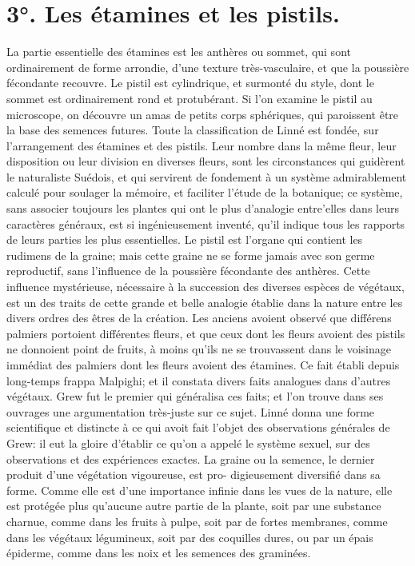 \section{3°. Les étamines et les pistils.}
La partie essentielle des étamines est les anthères ou sommet, qui sont ordinairement de forme arrondie, d'une texture très-vasculaire, et que la poussière fécondante recouvre.
Le pistil est cylindrique, et surmonté du style, dont le sommet est ordinairement rond et protubérant.
Si l'on examine le pistil au microscope, on découvre un amas de petits corps sphériques, qui paroissent être la base des semences futures.
Toute la classification de Linné est fondée, sur l'arrangement des étamines et des pistils. Leur nombre dans la même fleur, leur disposition ou leur division en diverses fleurs, sont les circonstances qui guidèrent le naturaliste Suédois, et qui servirent de fondement à un système admirablement calculé pour soulager la mémoire, et faciliter l'étude de la botanique; ce système, sans associer toujours les plantes qui ont le plus d'analogie entre'elles dans leurs caractères généraux, est si ingénieusement inventé, qu'il indique tous les rapports de leurs parties les plus essentielles.\setcounter{page}{389} Le pistil est l'organe qui contient les rudimens de la graine; mais cette graine ne se forme jamais avec son germe reproductif, sans l'influence de la poussière fécondante des anthères. Cette influence mystérieuse, nécessaire à la succession des diverses espèces de végétaux, est un des traits de cette grande et belle analogie établie dans la nature entre les divers ordres des êtres de la création.
Les anciens avoient observé que différens palmiers portoient différentes fleurs, et que ceux dont les fleurs avoient des pistils ne donnoient point de fruits, à moins qu'ils ne se trouvassent dans le voisinage immédiat des palmiers dont les fleurs avoient des étamines. Ce fait établi depuis long-temps frappa Malpighi; et il constata divers faits analogues dans d'autres végétaux. Grew fut le premier qui généralisa ces faits; et l'on trouve dans ses ouvrages une argumentation très-juste sur ce sujet. Linné donna une forme scientifique et distincte à ce qui avoit fait l'objet des observations générales de Grew: il eut la gloire d'établir ce qu'on a appelé le système sexuel, sur des observations et des expériences exactes.
La graine ou la semence, le dernier produit d'une végétation vigoureuse, est pro-\setcounter{page}{390} digieusement diversifié dans sa forme. Comme elle est d'une importance infinie dans les vues de la nature, elle est protégée plus qu'aucune autre partie de la plante, soit par une substance charnue, comme dans les fruits à pulpe, soit par de fortes membranes, comme dans les végétaux légumineux, soit par des coquilles dures, ou par un épais épiderme, comme dans les noix et les semences des graminées.
